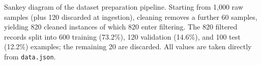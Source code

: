 \caption{Sankey diagram of the dataset preparation pipeline. Starting from 1{,}000 raw samples (plus 120 discarded at ingestion), cleaning removes a further 60 samples, yielding 820 cleaned instances of which 820 enter filtering. The 820 filtered records split into 600 training (73.2\%), 120 validation (14.6\%), and 100 test (12.2\%) examples; the remaining 20 are discarded. All values are taken directly from \texttt{data.json}.}
